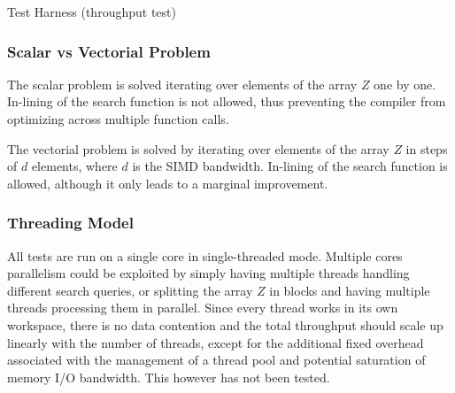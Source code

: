 \documentclass[preprint,1p,times]{elsarticle}
\begin{document}
\begin{algorithm}[ht]
	\caption{Test Harness (throughput test)}
	\label{alg:harness}
	\begin{algorithmic}
  			  
                 
					  
						 
					\EndFor
					 
				\EndFor
			\EndFor
			  
		\EndFunction
	\end{algorithmic}
\end{algorithm}

\subsubsection{Scalar vs Vectorial Problem}
The scalar problem is solved iterating over elements of the array $Z$ one by one. In-lining of the search function is not allowed, thus preventing the compiler from optimizing across multiple function calls.

The vectorial problem is solved by iterating over elements of the array $Z$ in steps of $d$ elements, where $d$ is the SIMD bandwidth. In-lining of the search function is allowed, although it only leads to a marginal improvement.

\subsubsection{Threading Model}
All tests are run on a single core in single-threaded mode. Multiple cores parallelism could be exploited by simply having multiple threads handling different search queries, or splitting the array $Z$ in blocks and having multiple threads processing them in parallel. Since every thread works in its own workspace, there is no data contention and the total throughput should scale up linearly with the number of threads, except for the additional fixed overhead associated with the management of a thread pool and potential saturation of memory I/O bandwidth. This however has not been tested.
\end{document}
